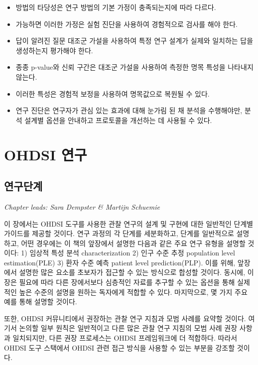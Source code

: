 \documentclass[10.5pt]{book}
\theoremstyle{definition}
\theoremstyle{definition}
\theoremstyle{definition}
\theoremstyle{remark}
\let\BeginKnitrBlock\begin \let\EndKnitrBlock\end
\begin{document}
\BeginKnitrBlock{rmdsummary}
\begin{itemize}
\item
  방법의 타당성은 연구 방법의 기본 가정이 충족되는지에 따라 다르다.
\item
  가능하면 이러한 가정은 실험 진단을 사용하여 경험적으로 검사를 해야
  한다.
\item
  답이 알려진 질문 대조군 가설을 사용하여 특정 연구 설계가 실제와
  일치하는 답을 생성하는지 평가해야 한다.
\item
  종종 p-value와 신뢰 구간은 대조군 가설을 사용하여 측정한 명목 특성을
  나타내지 않는다.
\item
  이러한 특성은 경험적 보정을 사용하여 명목값으로 복원될 수 있다.
\item
  연구 진단은 연구자가 관심 있는 효과에 대해 눈가림 된 채 분석을
  수행해야만, 분석 설계별 옵션을 안내하고 프로토콜을 개선하는 데 사용될
  수 있다.
\end{itemize}
\EndKnitrBlock{rmdsummary}

\part{OHDSI 연구}\label{part-ohdsi-}

\chapter{연구단계}\label{StudySteps}

\emph{Chapter leads: Sara Dempster \& Martijn Schuemie}

이 장에서는 OHDSI 도구를 사용한 관찰 연구의 설계 및 구현에 대한 일반적인
단계별 가이드를 제공할 것이다. 연구 과정의 각 단계를 세분화하고, 단계를
일반적으로 설명하고, 어떤 경우에는 이 책의 앞장에서 설명한 다음과 같은
주요 연구 유형을 설명할 것이다: 1) 임상적 특성 분석 characterization 2)
인구 수준 추정 population level estimation(PLE) 3) 환자 수준 예측
patient level prediction(PLP). 이를 위해, 앞장에서 설명한 많은 요소를
초보자가 접근할 수 있는 방식으로 합성할 것이다. 동시에, 이 장은 필요에
따라 다른 장에서보다 심층적인 자료를 추구할 수 있는 옵션을 통해 실제적인
높은 수준의 설명을 원하는 독자에게 적합할 수 있다. 마지막으로, 몇 가지
주요 예를 통해 설명할 것이다.

또한, OHDSI 커뮤니티에서 권장하는 관찰 연구 지침과 모범 사례를 요약할
것이다. 여기서 논의할 일부 원칙은 일반적이고 다른 많은 관찰 연구 지침의
모범 사례 권장 사항과 일치되지만, 다른 권장 프로세스는 OHDSI
프레임워크에 더 적합하다. 따라서 OHDSI 도구 스택에서 OHDSI 관련 접근
방식을 사용할 수 있는 부분을 강조할 것이다.
\end{document}
